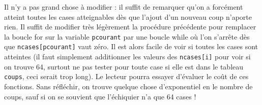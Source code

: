 

\Q
Il n'y a pas grand chose à modifier : il suffit de remarquer qu'on a forcément atteint toutes les cases atteignables dès que l'ajout d'un nouveau coup n'aporte rien. Il suffit de modifier très légèrement la procédure précédente pour remplacer la boucle \og for \fg sur la variable \texttt{pcourant} par une boucle \og while \fg où l'on s'arrête dès que \texttt{ncases[pcourant]} vaut zéro. Il est alors facile de voir si toutes les cases sont atteintes (il faut simplement additionner les valeurs des \texttt{ncases[i]} pour voir si on trouve 64, surtout ne pas tester pour toute case si elle est dans le tableau \texttt{coups}, ceci serait trop long). Le lecteur pourra essayer d'évaluer le coût de ces fonctions. Sans réfléchir, on trouve quelque chose d'exponentiel en le nombre de coups, sauf si on se souvient que l'échiquier n'a que 64 cases !

\Fin
